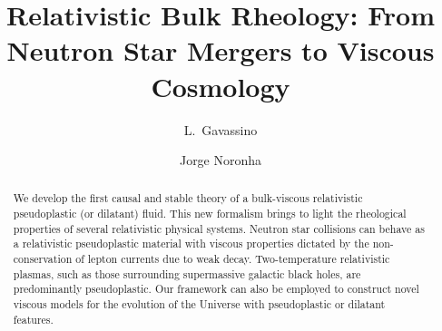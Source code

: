 \documentclass[aps,prl,noshowpacs,noshowkeys,floatfix,superscriptaddress,singlecolum,nofootinbib]{revtex4-2}
\theoremstyle{definition}
\theoremstyle{theorem}
\begin{document}
\title{Relativistic Bulk Rheology: From Neutron Star Mergers to Viscous Cosmology}
\author{L.~Gavassino}


\author{Jorge Noronha}


\begin{abstract}
We develop the first causal and stable theory of a bulk-viscous relativistic pseudoplastic (or dilatant) fluid. This new formalism brings to light the rheological properties of several relativistic physical systems. Neutron star collisions can behave as a relativistic pseudoplastic material with viscous properties dictated by the non-conservation of lepton currents due to weak decay. Two-temperature relativistic plasmas, such as those surrounding supermassive galactic black holes, are predominantly pseudoplastic. Our framework can also be employed to construct novel viscous models for the evolution of the Universe with pseudoplastic or dilatant features.    
\end{abstract} 



\maketitle
\end{document}
